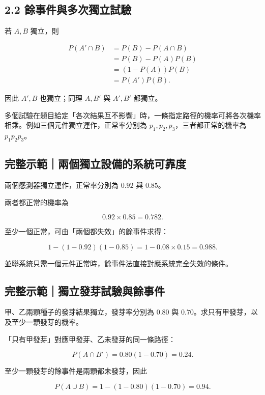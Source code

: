 \documentclass[11pt,a4paper]{article}
\begin{document}
\subsection{2.2 餘事件與多次獨立試驗}\label{ux9918ux4e8bux4ef6ux8207ux591aux6b21ux7368ux7acbux8a66ux9a57}

若 \(A,B\) 獨立，則

\[
\begin{aligned}
P(A'\cap B)
&=P(B)-P(A\cap B)\\
&=P(B)-P(A)P(B)\\
&=(1-P(A))P(B)\\
&=P(A')P(B).
\end{aligned}
\]

因此 \(A',B\) 也獨立；同理 \(A,B'\) 與 \(A',B'\) 都獨立。

多個試驗在題目給定「各次結果互不影響」時，一條指定路徑的機率可將各次機率相乘。例如三個元件獨立運作，正常率分別為 \(p_1,p_2,p_3\)，三者都正常的機率為 \(p_1p_2p_3\)。

\begin{HandoutWorkedExample}

\subsection{完整示範｜兩個獨立設備的系統可靠度}\label{ux5b8cux6574ux793aux7bc4ux5169ux500bux7368ux7acbux8a2dux5099ux7684ux7cfbux7d71ux53efux9760ux5ea6}

兩個感測器獨立運作，正常率分別為 \(0.92\) 與 \(0.85\)。

兩者都正常的機率為

\[
0.92\times0.85=\boxed{0.782}.
\]

至少一個正常，可由「兩個都失效」的餘事件求得：

\[
1-(1-0.92)(1-0.85)
=1-0.08\times0.15
=\boxed{0.988}.
\]

並聯系統只需一個元件正常時，餘事件法直接對應系統完全失效的條件。

\end{HandoutWorkedExample}

\begin{HandoutWorkedExample}

\subsection{完整示範｜獨立發芽試驗與餘事件}\label{ux5b8cux6574ux793aux7bc4ux7368ux7acbux767cux82bdux8a66ux9a57ux8207ux9918ux4e8bux4ef6}

甲、乙兩顆種子的發芽結果獨立，發芽率分別為 \(0.80\) 與 \(0.70\)。求只有甲發芽，以及至少一顆發芽的機率。

「只有甲發芽」對應甲發芽、乙未發芽的同一條路徑：

\[
P(A\cap B')=0.80(1-0.70)=\boxed{0.24}.
\]

至少一顆發芽的餘事件是兩顆都未發芽，因此

\[
P(A\cup B)=1-(1-0.80)(1-0.70)=\boxed{0.94}.
\]

\end{HandoutWorkedExample}
\end{document}
